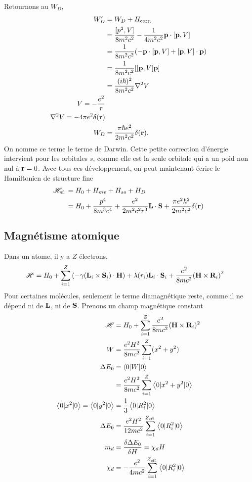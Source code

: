 Retournons au $W_D$,
\begin{align}
    W_D'&=W_D+H_{\rm corr.}\\
        &=\frac{[p^2,V]}{8m^2c^2}
        -\frac{1}{4m^2c^2}\vb{p}\cdot[\vb{p},V]\\
        &=\frac1{8m^2c^2}\qty(
        -\vb{p}\cdot[\vb{p},V]+[\vb{p},V]\cdot\vb{p})\\
        &=\frac1{8m^2c^2}[[\vb{p},V]\vb{p}]\\
        &=\frac{(i\hbar)^2}{8m^2c^2}\nabla^2V\\
        V=-\frac{e^2}r\\
        \nabla^2V=-4\pi e^2\delta(\vb{r})\\
    W_D&=\frac{\pi\hbar e^2}{2m^2c^2}\delta(\vb{r}).
\end{align}
On nomme ce terme le terme de Darwin. Cette petite correction d'énergie intervient
pour les orbitales $s$, comme elle est la seule orbitale qui a un poid non nul
à $\vb{r}=0$. Avec tous ces développement, on peut maintenant écrire le
Hamiltonien de structure fine
\begin{align}
    \mathscr{H}_{\rm sf.}&=H_0+H_{mv}+H_{so}+H_D\\
                         &=H_0+\frac{p^4}{8m^3c^4}+\frac{e^2}{2m^2c^2r^3}\vb{L}
                         \cdot\vb{S}+\frac{\pi e^2\hbar^2}{2m^2c^2}\delta(\vb{r})
\end{align}

\subsection{Magnétisme atomique} %
\label{sub:Magnétisme atomique}

Dans un atome, il y a $Z$ électrons.
\begin{align}
    \mathscr{H}&=H_0+\sum_{i=1}^Z\qty(-\gamma(\vb{L}_i\times\vb{S}_i)\cdot\vb{H})
    +\lambda(r_i)\vb{L}_i\cdot\vb{S}_i
    +\frac{e^2}{8mc^2}\qty(\vb{H}\times\vb{R}_i)^2
\end{align}
Pour certaines molécules, seulement le terme diamagnétique reste, comme il ne
dépend ni de $\vb{L}$, ni de $\vb{S}$. Prenons un champ magnétique constant
\begin{align}
    \mathscr{H}&=H_0+\sum_{i=1}^Z\frac{e^2}{8mc^2}(\vb{H}\times\vb{R}_i)^2\\
    W&=\frac{e^2H^2}{8mc^2}\sum_{i=1}^Z(x^2+y^2)\\
    \Delta E_0&=\expval{0|W|0}\\
              &=\frac{e^2H^2}{8mc^2}\sum_{i=1}^Z\expval{0|x^2+y^2|0}\\
    \expval{0|x^2|0}=\expval{0|y^2|0}&=\frac13\expval{0|R_i^2|0}\\
\Delta E_0&=\frac{e^2H^2}{12mc^2}\sum_{i=1}^{Z_{\rm eff.}}\expval{0|R_i^2|0}\\
m_d&=\frac{\delta\Delta E_0}{\delta H}=\chi_d H\\
\chi_d&=-\frac{e^2}{4mc^2}\sum_{i=1}^{Z_{\rm eff.}}\expval{0|R_i^2|0}
\end{align}

